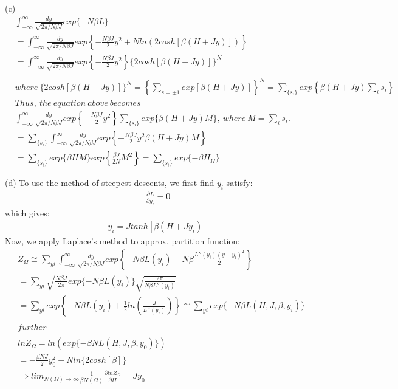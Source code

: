 \documentclass[12pt,titlepage]{article}
\numberwithin{equation}{section}
\begin{document}
(c)
\begin{align*}
&\int ^{\infty }_{-\infty }\frac{dy}{\sqrt{2\pi /N\beta J}} exp\{-N\beta L\}\\
&=\int ^{\infty }_{-\infty }\frac{dy}{\sqrt{2\pi /N\beta J}} exp\left\{-\frac{N\beta J}{2} y^{2} +Nln( 2cosh[ \beta ( H+Jy)])\right\}\\
&=\int ^{\infty }_{-\infty }\frac{dy}{\sqrt{2\pi /N\beta J}} exp\left\{-\frac{N\beta J}{2} y^{2}\right\}\{2cosh[ \beta ( H+Jy)]\}^{N}\\
\\
&where\ \{2cosh[ \beta ( H+Jy)]\}^{N} =\left\{\sum _{s=\pm 1} exp[ \beta ( H+Jy)]\right\}^{N} =\sum _{\{s_{i}\}} exp\left\{\beta ( H+Jy)\sum _{i} s_{i}\right\}\\
&Thus,\ the\ equation\ above\ becomes\\
&\int ^{\infty }_{-\infty }\frac{dy}{\sqrt{2\pi /N\beta J}} exp\left\{-\frac{N\beta J}{2} y^{2}\right\}\sum _{\{s_{i}\}} exp\{\beta ( H+Jy) M\} ,\ where\ M=\sum _{i} s_{i} .\\
&=\sum _{\{s_{i}\}}\int ^{\infty }_{-\infty }\frac{dy}{\sqrt{2\pi /N\beta J}} exp\left\{-\frac{N\beta J}{2} y^{2} \beta ( H+Jy) M\right\}\\
&=\sum _{\{s_{i}\}} exp\{\beta HM\} exp\left\{\frac{\beta J}{2N} M^{2}\right\} =\sum _{\{s_{i}\}} exp\{-\beta H_{\Omega }\}
\end{align*}

(d) To use the method of steepest descents, we first find $y_i$ satisfy:
\begin{align*}
    \frac{\partial L}{\partial y_i}=0
\end{align*}
which gives:
\begin{align*}
    y_i=Jtanh[\beta(H+Jy_i)]
\end{align*}
Now, we apply Laplace's method to approx. partition function:
\begin{align*}
& Z_{\Omega } \cong \sum _{yi}\int ^{\infty }_{-\infty }\frac{dy}{\sqrt{2\pi /N\beta J}} exp\left\{-N\beta L( y_{i}) -N\beta \frac{L''( y_{i})( y-y_{i})^{2}}{2}\right\}\\
& =\sum _{yi}\sqrt{\frac{N\beta J}{2\pi }} exp\{-N\beta L( y_{i})\}\sqrt{\frac{2\pi }{N\beta L''( y_{i})}}\\
& =\sum _{yi} exp\left\{-N\beta L( y_{i}) +\frac{1}{2} ln\left(\frac{J}{L''( y_{i})}\right)\right\} \cong \sum _{yi} exp\{-N\beta L( H,J,\beta ,y_{i})\}\\
\\
& further\\
\\
& lnZ_{\Omega } =ln( exp\{-\beta NL( H,J,\beta ,y_{0})\})\\
& =-\frac{\beta NJ}{2} y^{2}_{0} +Nln\{2cosh[ \beta ]\}\\
& \Rightarrow lim_{N( \Omega )\rightarrow \infty }\frac{1}{\beta N( \Omega )}\frac{\partial lnZ_{\Omega }}{\partial H} =Jy_{0}
\end{align*}
\newpage
\end{document}
